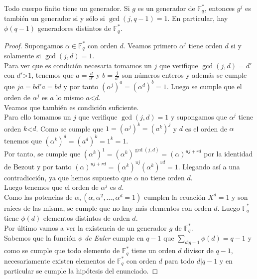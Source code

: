 \begin{teorema}
	Todo cuerpo finito tiene un generador. Si $g$ es un generador de $\mathbb{F}^{*}_q$, entonces $g^j$ es también un generador si y sólo si $\operatorname{gcd}(j,q-1)=1$. En particular, hay $\phi(q-1)$ generadores distintos de $\mathbb{F}^*_q$.
\end{teorema}
\begin{proof}
		Supongamos $\alpha \in \mathbb{F}^*_q$ con orden $d$. Veamos primero $\alpha^j$ tiene orden $d$ si y solamente si $\operatorname{gcd}(j,d)=1$.\\

		Para ver que es condición necesaria tomamos un $j$ que verifique $\operatorname{gcd}(j, d)=d'$ con $d'$\textgreater$ 1$, tenemos que $a=\frac{d}{d'}$ y $b=\frac{j}{d'}$ son números enteros y además se cumple que $ja=bd'a=bd$ y por tanto $(\alpha^j)^a=(\alpha^d)^b=1$. Luego se cumple que el orden de $\alpha^j$ es $a$ lo mismo $a$\textless $d$.\\

		Veamos que también es condición suficiente.\\ Para ello tomamos un $j$ que verifique $\operatorname{gcd}(j,d)=1$ y supongamos que $\alpha^j$ tiene orden $k$\textless $d$. Como se cumple que $1=(\alpha^j)^k=(a^k)^j$ y $d$ es el orden de $\alpha$ tenemos que $(\alpha^k)^d=(a^d)^k=1^k=1$.\\
		Por tanto, se cumple que  $(\alpha^k)^1=(\alpha^k)^{\operatorname{gcd}(j,d)}=(\alpha)^{uj+rd}$ por la identidad de Bezout y por tanto $(\alpha)^{uj+rd}=(\alpha^k)^{uj}(\alpha^k)^{vd}=1$. Llegando así a una contradicción, ya que hemos supuesto que $\alpha$ no tiene orden $d$.\\
		Luego tenemos que el orden de $\alpha^j$ es $d$.\\

		Como las potencias de $\alpha,(\alpha,\alpha^2,\dots,\alpha^d=1)$ cumplen la ecuación $X^d=1$ y son raíces de las misma, se cumple que no hay más elementos con orden $d$. Luego $\mathbb{F}^*_q$ tiene $\phi(d)$ elementos distintos de orden $d$.\\
		Por último vamos a ver la existencia de un generador $g$ de $\mathbb{F}_q^*$.\\
		Sabemos que la función $\phi$ \emph{de Euler} cumple en $q-1$ que $\sum_{d|q-1}\phi(d)=q-1$ y como se cumple que todo elemento de $\mathbb{F}^*_q$ tiene un orden $d$ divisor de $q-1$, necesariamente existen elementos de $\mathbb{F}^*_q$ con orden $d$ para todo $d|q-1$ y en particular se cumple la hipótesis del enunciado.
\end{proof}

